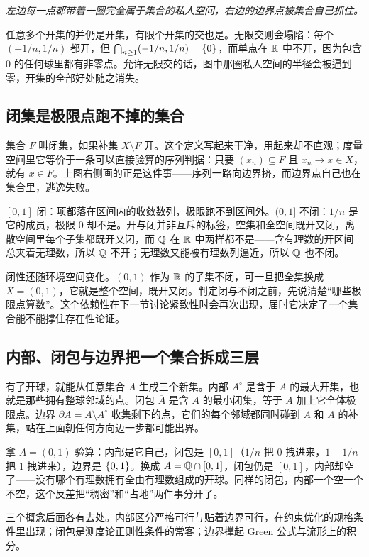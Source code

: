 \emph{左边每一点都带着一圈完全属于集合的私人空间，右边的边界点被集合自己抓住。}

任意多个开集的并仍是开集，有限个开集的交也是。无限交则会塌陷：每个 \((-1/n,1/n)\) 都开，但 \(\bigcap_{n\ge1}(-1/n,1/n)=\left\{0\right\}\)，而单点在 \(\mathbb{R}\) 中不开，因为包含 0 的任何球里都有非零点。允许无限交的话，图中那圈私人空间的半径会被逼到零，开集的全部好处随之消失。

\subsection{闭集是极限点跑不掉的集合}

集合 \(F\) 叫闭集，如果补集 \(X\setminus F\) 开。这个定义写起来干净，用起来却不直观；度量空间里它等价于一条可以直接验算的序列判据：只要 \((x_n)\subseteq F\) 且 \(x_n\to x\in X\)，就有 \(x\in F\)。上图右侧画的正是这件事——序列一路向边界挤，而边界点自己也在集合里，逃逸失败。

\([0,1]\) 闭：项都落在区间内的收敛数列，极限跑不到区间外。\((0,1]\) 不闭：\(1/n\) 是它的成员，极限 0 却不是。开与闭并非互斥的标签，空集和全空间既开又闭，离散空间里每个子集都既开又闭，而 \(\mathbb{Q}\) 在 \(\mathbb{R}\) 中两样都不是——含有理数的开区间总夹着无理数，所以 \(\mathbb{Q}\) 不开；无理数又能被有理数列逼近，所以 \(\mathbb{Q}\) 也不闭。

闭性还随环境空间变化。\((0,1)\) 作为 \(\mathbb{R}\) 的子集不闭，可一旦把全集换成 \(X=(0,1)\)，它就是整个空间，既开又闭。判定闭与不闭之前，先说清楚``哪些极限点算数''。这个依赖性在下一节讨论紧致性时会再次出现，届时它决定了一个集合能不能撑住存在性论证。

\subsection{内部、闭包与边界把一个集合拆成三层}

有了开球，就能从任意集合 \(A\) 生成三个新集。内部 \(A^\circ\) 是含于 \(A\) 的最大开集，也就是那些拥有整球邻域的点。闭包 \(\overline A\) 是含 \(A\) 的最小闭集，等于 \(A\) 加上它全体极限点。边界 \(\partial A=\overline A\setminus A^\circ\) 收集剩下的点，它们的每个邻域都同时碰到 \(A\) 和 \(A\) 的补集，站在上面朝任何方向迈一步都可能出界。

拿 \(A=(0,1)\) 验算：内部是它自己，闭包是 \([0,1]\)（\(1/n\) 把 0 拽进来，\(1-1/n\) 把 1 拽进来），边界是 \(\left\{0,1\right\}\)。换成 \(A=\mathbb{Q}\cap[0,1]\)，闭包仍是 \([0,1]\)，内部却空了——没有哪个有理数拥有全由有理数组成的开球。同样的闭包，内部一个空一个不空，这个反差把``稠密''和``占地''两件事分开了。

三个概念后面各有去处。内部区分严格可行与贴着边界可行，在约束优化的规格条件里出现；闭包是测度论正则性条件的常客；边界撑起 Green 公式与流形上的积分。

